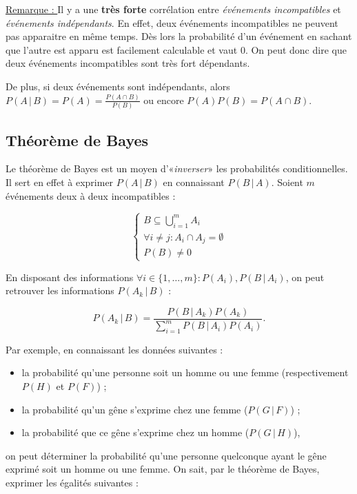 \documentclass{article}
\begin{document}
		\underline{Remarque : } Il y a une \textbf{très forte} corrélation entre \textit{événements incompatibles} et \textit{événements indépendants}. En effet, deux
		événements incompatibles ne peuvent pas apparaitre en même temps. Dès lors la probabilité d'un événement en sachant que l'autre est apparu est facilement calculable et
		vaut $0$. On peut donc dire que deux événements incompatibles sont très fort dépendants.

		De plus, si deux événements sont indépendants, alors $P(A \, | \, B) = P(A)= \frac {P(A \cap B)}{P(B)}$ ou encore $P(A)P(B) = P(A \cap B)$.

	\subsection{Théorème de Bayes}
		Le théorème de Bayes est un moyen d'«\textit{inverser}» les probabilités conditionnelles. Il sert en effet à exprimer $P(A \, | \, B)$ en connaissant $P(B  \, | \, A)$.
		Soient $m$ événements deux à deux incompatibles :

		\[\left\{\begin{aligned}
			B \subseteq \bigcup_{i=1}^mA_i \\
			\forall i \neq j : A_i \cap A_j = \emptyset \\
			P(B) \neq 0
		\end{aligned}\right.\]

		En disposant des informations $\forall i \in \{1, \ldots, m\} : P(A_i), P(B \, | \, A_i)$, on peut retrouver les informations $P(A_k \, | \, B)$ :

		\[P(A_k \, | \, B) = \frac {P(B \, | \, A_k)P(A_k)}{\sum_{i=1}^mP(B \, | \, A_i)P(A_i)}.\]

		Par exemple, en connaissant les données suivantes :
		
		\begin{itemize}
			\item la probabilité qu'une personne soit un homme ou une femme (respectivement $P(H)$ et $P(F)$) ;
			\item la probabilité qu'un gêne s'exprime chez une femme ($P(G \, | \, F)$) ;
			\item la probabilité que ce gêne s'exprime chez un homme ($P(G \, | \, H)$),
		\end{itemize}

		on peut déterminer la probabilité qu'une personne quelconque ayant le gêne exprimé soit un homme ou une femme. On sait, par le théorème de Bayes, exprimer les
		égalités suivantes :
\end{document}
